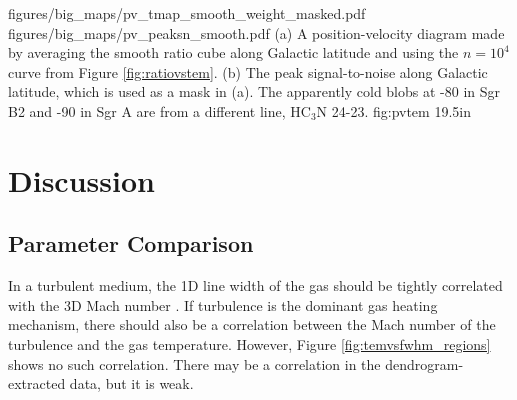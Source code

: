 \RotFigureTwoAA
{figures/big_maps/pv_tmap_smooth_weight_masked.pdf}
{figures/big_maps/pv_peaksn_smooth.pdf}
{(a) A position-velocity diagram made by averaging the smooth ratio cube along
Galactic latitude and using the $n=10^4$ \percc curve from Figure
\ref{fig:ratiovstem}.  (b) The peak signal-to-noise along Galactic latitude,
which is used as a mask in (a).  The apparently cold blobs at -80 \kms in Sgr
B2 and -90 \kms in Sgr A are from a different line, HC$_3$N 24-23.
}
{fig:pvtem}
{1}{9.5in}



\clearpage
\section{Discussion}
\label{sec:discussion}
\subsection{Parameter Comparison}
 In a
turbulent medium, the 1D line width of the gas should be tightly correlated
with the 3D Mach number \citep[e.g.][]{Federrath2011a}.  If turbulence is the
dominant gas heating mechanism, there should also be a correlation between the
Mach number of the turbulence and the gas temperature.  However, Figure
\ref{fig:temvsfwhm_regions} shows no such correlation.  There may be a
correlation in the dendrogram-extracted data, but it is weak.

